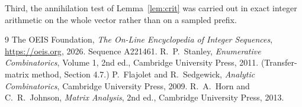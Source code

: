 \documentclass[11pt,a4paper]{article}
\theoremstyle{plain}
\theoremstyle{definition}
\begin{document}
Third, the annihilation test of Lemma~\ref{lem:crit} was carried out in exact integer
arithmetic on the whole vector rather than on a sampled prefix.

\begin{thebibliography}{9}
 The OEIS Foundation, \emph{The On-Line Encyclopedia of Integer
Sequences}, \url{https://oeis.org}, 2026. Sequence A221461.
 R.~P.~Stanley, \emph{Enumerative Combinatorics}, Volume 1, 2nd ed.,
Cambridge University Press, 2011. (Transfer-matrix method, Section 4.7.)
 P.~Flajolet and R.~Sedgewick, \emph{Analytic Combinatorics}, Cambridge
University Press, 2009.
 R.~A.~Horn and C.~R.~Johnson, \emph{Matrix Analysis}, 2nd ed., Cambridge
University Press, 2013.
\end{thebibliography}
\end{document}
